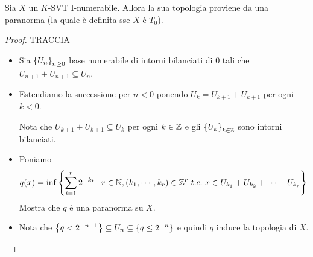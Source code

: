 \begin{exercise}
Sia $X$ un $K$-SVT I-numerabile. Allora la sua topologia proviene da una paranorma (la quale \`e definita sse $X$ \`e $T_0$).
\end{exercise}
\begin{proof}
TRACCIA
\begin{itemize}
    \item Sia $\left\{{U_n}\right\}_{n\geq 0}$ base numerabile di intorni bilanciati di $0$ tali che $U_{n+1}+U_{n+1}\subseteq U_n$.
    \item Estendiamo la successione per $n<0$ ponendo $U_k=U_{k+1}+U_{k+1}$ per ogni $k<0$.
    
    Nota che $U_{k+1}+U_{k+1}\subseteq U_k$ per ogni $k\in \mathbb{Z}$ e gli $\left\{{U_k}\right\}_{k\in\mathbb{Z}}$ sono intorni bilanciati. 
    \item Poniamo
    \[q(x)=\inf\left\{{\sum_{i=1}^r2^{-ki}\mid r\in\mathbb{N},(k_1,\cdots, k_r)\in\mathbb{Z}^r\ t.c.\ x\in U_{k_1}+U_{k_2}+\cdots+U_{k_r}}\right\}\]
    Mostra che $q$ \`e una paranorma su $X$.
    \item Nota che $\left\{{q<2^{-n-1}}\right\}\subseteq U_n\subseteq \left\{{q\leq 2^{-n}}\right\}$ e quindi $q$ induce la topologia di $X$.
\end{itemize}
\end{proof}